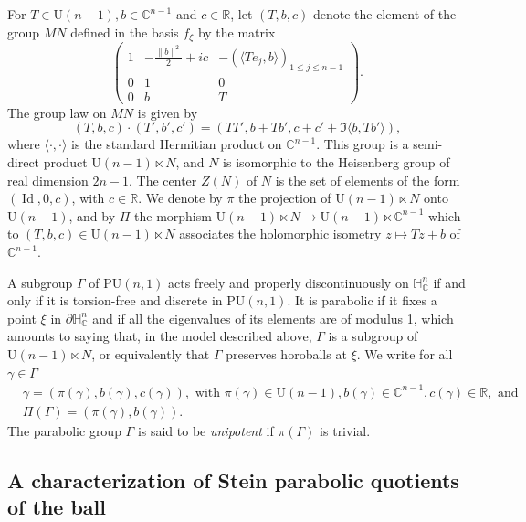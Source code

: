 \documentclass{article}
\theoremstyle{definition}
\theoremstyle{remark}
\newcommand{\C}{\mathbb{C}}
\newcommand{\R}{\mathbb{R}}
\newcommand{\HNC}{\mathbb{H}^{n}_{\C}}
\newcommand{\PHNC}{\partial\mathbb{H}^{n}_{\C}}
\newcommand{\PU}{\mathrm{PU}}
\DeclareMathOperator{\Id}{\text{Id}}
\begin{document}
	For $T\in \mathrm{U}(n-1),b\in \C^{n-1}$ and $c\in \R$, let $(T,b,c)$ denote the element of the group $MN$ defined in the basis $f_{\xi}$ by the matrix\begin{equation*}
		\left(\begin{array}{ccc}
			1 & -\frac{\lVert b\rVert^{2}}{2}+ic & -(\langle Te_j,b\rangle)_{1\le j\le n-1} \\
			0 & 1 & 0 \\
			0 & b & T
		\end{array}\right).
	\end{equation*}
	The group law on $MN$ is given by\begin{equation*}
		(T,b,c)\cdot(T',b',c') = (TT',b+Tb',c+c'+\Im\langle b,Tb' \rangle),
	\end{equation*}
	where $\langle\cdot,\cdot\rangle$ is the standard Hermitian product on $\C^{n-1}$. This group is a semi-direct product $\mathrm{U}(n-1)\ltimes N$, and $N$ is isomorphic to the Heisenberg group of real dimension $2n-1$. The center $Z(N)$ of $N$ is the set of elements of the form $(\Id,0,c)$, with $c\in \R$. We denote by $\pi$ the projection of $\mathrm{U}(n-1)\ltimes N$ onto $\mathrm{U}(n-1)$, and by $\Pi$ the morphism $\mathrm{U}(n-1)\ltimes N \to \mathrm{U}(n-1)\ltimes \C^{n-1}$ which to $(T,b,c)\in \mathrm{U}(n-1)\ltimes N$ associates the holomorphic isometry $z\mapsto Tz+b$ of $\C^{n-1}$.
	
	A subgroup $\Gamma$ of $\PU(n,1)$ acts freely and properly discontinuously on $\HNC$ if and only if it is torsion-free and discrete in $\PU(n,1)$. It is parabolic if it fixes a point $\xi$ in $\PHNC$ and if all the eigenvalues of its elements are of modulus 1, which amounts to saying that, in the model described above, $\Gamma$ is a subgroup of $\mathrm{U}(n-1)\ltimes N$, or equivalently that $\Gamma$ preserves horoballs at $\xi$. We write for all $\gamma\in \Gamma$\begin{align*}
		&\gamma = (\pi(\gamma),b(\gamma),c(\gamma)), \text{ with } \pi(\gamma)\in \mathrm{U}(n-1),b(\gamma)\in \C^{n-1},c(\gamma)\in \R, \text{ and }\\
		&\Pi(\Gamma) = (\pi(\gamma),b(\gamma)).
	\end{align*}
	The parabolic group $\Gamma$ is said to be \textit{unipotent} if $\pi(\Gamma)$ is trivial.
		
	\subsection{A characterization of Stein parabolic quotients of the ball}
	
\end{document}
